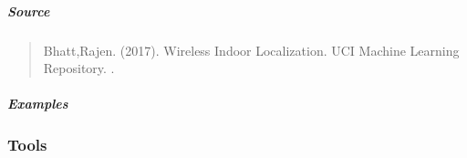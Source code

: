 \documentclass[letterpaper,10pt,english,openany,oneside]{sphinxmanual}
\begin{document}
\begin{fulllineitems}
\subparagraph{Source}
\label{\detokenize{api_reference/generated/QuadratiK.datasets.load_wireless_data:source}}\begin{quote}

\sphinxAtStartPar
Bhatt,Rajen. (2017). Wireless Indoor Localization. UCI Machine Learning Repository.
.
\end{quote}


\subparagraph{Examples}
\label{\detokenize{api_reference/generated/QuadratiK.datasets.load_wireless_data:examples}}
\begin{sphinxVerbatim}[commandchars=\\\{\}]
   
   
\end{sphinxVerbatim}

\end{fulllineitems}




\subsubsection{Tools}
\label{\detokenize{api_reference/index:tools}}\label{\detokenize{api_reference/index:module-QuadratiK.tools}}
\end{document}
